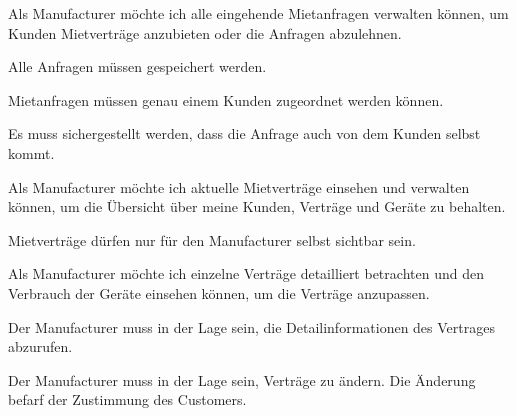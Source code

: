 \begin{tcolorbox}[colback=white,colframe=MidnightBlue!50!black, colbacktitle=MidnightBlue!75!black,title=\textbf{\underline{M2} Mietanfragen verwalten}]
  \label{req:m2}
  \glqq Als Manufacturer möchte ich alle eingehende Mietanfragen verwalten können, um Kunden Mietverträge anzubieten oder die Anfragen abzulehnen. \grqq
  \tcblower
  \begin{tcolorbox}[colback=white,colframe=white!50!black, colbacktitle=white!75!black,title=Task M2.1]
    Alle Anfragen müssen gespeichert werden.
  \end{tcolorbox}
  \begin{tcolorbox}[colback=white,colframe=white!50!black, colbacktitle=white!75!black,title=Task M2.2]
    Mietanfragen müssen genau einem Kunden zugeordnet werden können.
  \end{tcolorbox}
  \begin{tcolorbox}[colback=white,colframe=white!50!black, colbacktitle=white!75!black,title=Task M2.3]
    Es muss sichergestellt werden, dass die Anfrage auch von dem Kunden selbst kommt.
  \end{tcolorbox}
\end{tcolorbox}

\begin{tcolorbox}[colback=white,colframe=MidnightBlue!50!black, colbacktitle=MidnightBlue!75!black,title=\textbf{\underline{M3} Mietverträge verwalten}]
  \label{req:m3}
  \glqq Als Manufacturer möchte ich aktuelle Mietverträge einsehen und verwalten können, um die Übersicht über meine Kunden, Verträge und Geräte zu behalten. \grqq
  \tcblower
  \begin{tcolorbox}[colback=white,colframe=white!50!black, colbacktitle=white!75!black,title=Task M3.1]
    Mietverträge dürfen nur für den Manufacturer selbst sichtbar sein.
  \end{tcolorbox}
\end{tcolorbox}

\begin{tcolorbox}[colback=white,colframe=MidnightBlue!50!black, colbacktitle=MidnightBlue!75!black,title=\textbf{\underline{M4} Mietverträge Detailansicht}]
  \label{req:m4}
  \glqq Als Manufacturer möchte ich einzelne Verträge detailliert betrachten und den Verbrauch der Geräte einsehen können, um die Verträge anzupassen. \grqq
  \tcblower
  \begin{tcolorbox}[colback=white,colframe=white!50!black, colbacktitle=white!75!black,title=Task M4.1]
    Der Manufacturer muss in der Lage sein, die Detailinformationen des Vertrages abzurufen.
  \end{tcolorbox}
  \begin{tcolorbox}[colback=white,colframe=white!50!black, colbacktitle=white!75!black,title=Task M4.2]
    Der Manufacturer muss in der Lage sein, Verträge zu ändern. Die Änderung befarf der Zustimmung des Customers.
  \end{tcolorbox}
\end{tcolorbox}

